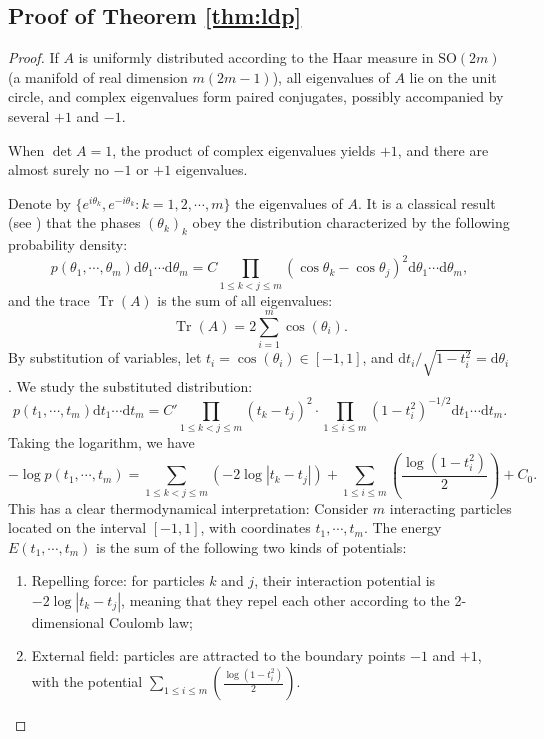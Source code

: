 \documentclass{article} %
\DeclareMathOperator{\Tr}{Tr}
\begin{document}
\subsection{Proof of Theorem \ref{thm:ldp}}
\begin{proof}
    If $A$ is uniformly distributed according to the Haar measure in $\mathrm{SO}(2m)$ (a manifold of real dimension $m(2m-1)$), 
    all eigenvalues of $A$ lie on the unit circle, 
    and complex eigenvalues form paired conjugates, possibly accompanied by several $+1$ and $-1$. 
    
    When $\det A = 1$, the product of complex eigenvalues yields $+1$, and there are almost surely no $-1$ or $+1$ eigenvalues. 

    Denote by $\{e^{i\theta_k}, e^{-i\theta_k} : k=1,2,\cdots, m\}$ the eigenvalues of $A$. It is a classical result (see \citet{weyl2016classical,Girko1985}) 
    that the phases $(\theta_k)_k$ obey the distribution characterized by the following probability density:
    \[p(\theta_1, \cdots, \theta_m)\mathrm{d}\theta_1 \cdots\mathrm{d}\theta_m  = C\prod_{1\leq k<j\leq m}(\cos \theta_k - \cos \theta_j)^2\mathrm{d}\theta_1 \cdots\mathrm{d}\theta_m,\]
    and the trace $\Tr(A)$ is the sum of all eigenvalues:
    \[ \Tr(A) = 2\sum_{i=1}^m \cos(\theta_i).\]
    By substitution of variables, let $t_i = \cos(\theta_i) \in [-1,1]$, and $\mathrm{d}t_i / \sqrt{1-t_i^2}= \mathrm{d}\theta_i$. We study the substituted distribution:
    \[p(t_1, \cdots, t_m)\mathrm{d}t_1 \cdots\mathrm{d}t_m  = C' \prod_{1\leq k<j\leq m}(t_k - t_j)^2 \cdot \prod_{1\leq i \leq m} (1-t_i^2)^{-1/2} \mathrm{d}t_1 \cdots\mathrm{d}t_m.\]
    Taking the logarithm, we have
    \[-\log p(t_1, \cdots, t_m) = \sum_{1\leq k<j\leq m} \left(-2 \log|t_k - t_j| \right) + \sum_{1\leq i \leq m} \left(\frac{\log (1-t_i^2)}{2}\right) + C_0.\]
    This has a clear thermodynamical interpretation: Consider $m$ interacting particles located on the interval $[-1, 1]$, with coordinates $t_1, \cdots, t_m$. 
    The energy $E(t_1, \cdots, t_m)$ is the sum of the following two kinds of potentials:
    \begin{enumerate}
        \item Repelling force: for particles $k$ and $j$, their interaction potential is $-2 \log|t_k - t_j|$, meaning that they repel each other according to the 2-dimensional Coulomb law;
        \item External field: particles are attracted to the boundary points $-1$ and $+1$, with the potential $\sum_{1\leq i \leq m} \left(\frac{\log (1-t_i^2)}{2}\right)$. 

\end{enumerate}
\end{proof}
\end{document}
